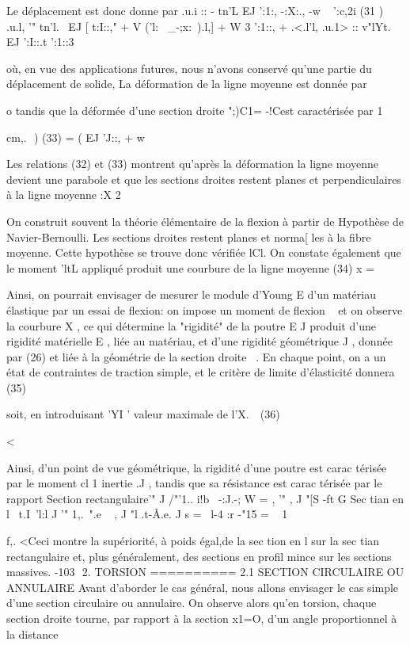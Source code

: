 {Le déplacement est donc donne par 
.u.i  ::  - tn'L EJ  ':1:, -:X:.,  -w ~  ':c,2i  
(31 )  .u.l,  '"  tn'l. ~EJ  [ t:I::,"  +  V ('l:~ _-;x:~).l,]  + W 3 ':1::,  + .<.l'l,  
.u.1>  ::  v"lYt. EJ  ':I::.t ':1::3  

où, en vue des applications futures, nous n'avons conservé qu'une partie du déplacement de solide, La déformation de la ligne moyenne est donnée par 

o
tandis que la déformée d'une section droite ";)C1= -!Cest caractérisée par
1 

cm,.  ) 
(33) 
=
( EJ 'J::, + w~ 

Les relations (32) et (33) montrent qu'après la déformation la ligne moyenne devient une parabole et que les sections droites restent planes et perpendi­culaires à la ligne moyenne 
:X
2 

On construit souvent la théorie élémentaire de la flexion à partir de 
Hypothèse de Navier-Bernoulli. Les sections droites restent planes et norma­[ les à la fibre moyenne. 
Cette hypothèse se trouve donc vérifiée lCl. On constate également que le moment 'ltL appliqué produit une courbure de la ligne moyenne 
(34) 
x = 

Ainsi, on pourrait envisager de mesurer le module d'Young E d'un matériau élastique par un essai de flexion: on impose un moment de flexion ~ et on observe la courbure X , ce qui détermine la "rigidité" de la poutre E J produit d'une rigidité matérielle E , liée au matériau, et d'une rigidité géométrique J , donnée par (26) et liée à la géométrie de la section droite 
~. 
En chaque point, on a un état de contraintes de traction simple, et le critère de limite d'élasticité donnera 
(35) 


soit, en introduisant 'YI ' valeur maximale de l'X.~\ 
(36) 

< 

Ainsi, d'un point de vue géométrique, la rigidité d'une poutre est 
carac térisée  par le moment  cl 1 inertie  .J  ,  tandis  que  sa  résistance  est  carac­ 
térisée par le rapport Section rectangulaire'"  J /"'1..  
i!b~ -:J.-; W  
 =  ,  '"  ,  J "[S  -ft G  
Sec tian  en  l  
~t.I~'l:l  J  '"  1,.~".e ~  ,  J "l  .t-Â.e.  J s  =  ~l­-4  :r -"15  =  ~ 1­ 

f,. <­Ceci montre la supériorité, à poids égal,de la sec tion en l sur la sec tian rectangulaire et, plus généralement, des sections en profil mince sur les sections massives. 
-103 ­
2. TORSION 
========== 
2.1 SECTION CIRCULAIRE OU ANNULAIRE 
Avant d'aborder le cas général, nous allons envisager le cas simple d'une section circulaire ou annulaire. On ohserve alors qu'en torsion, chaque section droite tourne, par rapport à la section x1=O, d'un angle proportion­nel à la distance 


}
